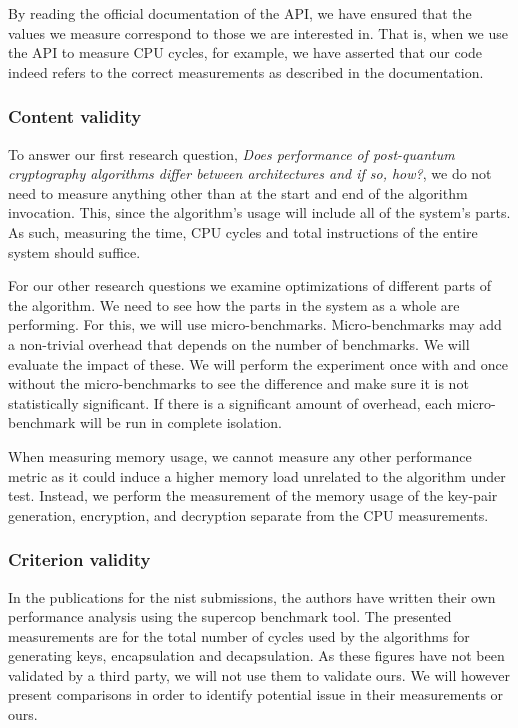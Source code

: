 By reading the official documentation of the API, we have ensured that the values we measure correspond to those we are interested in. That is, when we use the API to measure CPU cycles, for example, we have asserted that our code indeed refers to the correct measurements as described in the documentation.

\subsubsection{Content validity}


To answer our first research question, \textit{Does performance of post-quantum cryptography algorithms differ between architectures and if so, how?},  we do not need to measure anything other than at the start and end of the algorithm invocation. This, since the algorithm's usage will include all of the system's parts. As such, measuring the time, CPU cycles and total instructions of the entire system should suffice.

For our other research questions we examine optimizations of different parts of the algorithm. We need to see how the parts in the system as a whole are performing. For this, we will use micro-benchmarks. Micro-benchmarks may add a non-trivial overhead that depends on the number of benchmarks. We will evaluate the impact of these. We will perform the experiment once with and once without the micro-benchmarks to see the difference and make sure it is not statistically significant. If there is a significant amount of overhead, each micro-benchmark will be run in complete isolation.

When measuring memory usage, we cannot measure any other performance metric as it could induce a higher memory load unrelated to the algorithm under test. Instead, we perform the measurement of the memory usage of the key-pair generation, encryption, and decryption separate from the CPU measurements.

\subsubsection{Criterion validity}
In the publications for the \gls{nist} submissions, the authors have written their own performance analysis using the \gls{supercop} benchmark tool. The presented measurements are for the total number of cycles used by the algorithms for generating keys, encapsulation and decapsulation. As these figures have not been validated by a third party, we will not use them to validate ours. We will however present comparisons in order to identify potential issue in their measurements or ours.


